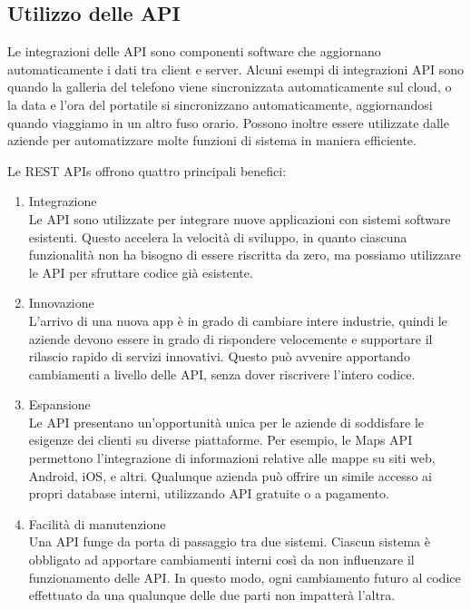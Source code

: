 \subsection{Utilizzo delle API}
Le integrazioni delle API sono componenti software che aggiornano automaticamente i dati tra client e server. Alcuni esempi di integrazioni API sono quando la galleria del telefono viene sincronizzata automaticamente sul cloud, o la data e l'ora del portatile si sincronizzano automaticamente, aggiornandosi quando viaggiamo in un altro fuso orario. Possono inoltre essere utilizzate dalle aziende per automatizzare molte funzioni di sistema in maniera efficiente.

Le REST APIs offrono quattro principali benefici:
\begin{enumerate}
    \item Integrazione\\
    Le API sono utilizzate per integrare nuove applicazioni con sistemi software esistenti. Questo accelera la velocità di sviluppo, in quanto ciascuna funzionalità non ha bisogno di essere riscritta da zero, ma possiamo utilizzare le API per sfruttare codice già esistente.
    \item Innovazione\\
    L'arrivo di una nuova app è in grado di cambiare intere industrie, quindi le aziende devono essere in grado di rispondere velocemente e supportare il rilascio rapido di servizi innovativi. Questo può avvenire apportando cambiamenti a livello delle API, senza dover riscrivere l'intero codice.
    \item Espansione\\
    Le API presentano un'opportunità unica per le aziende di soddisfare le esigenze dei clienti su diverse piattaforme. Per esempio, le Maps API permettono l'integrazione di informazioni relative alle mappe su siti web, Android, iOS, e altri. Qualunque azienda può offrire un simile accesso ai propri database interni, utilizzando API gratuite o a pagamento.
    \item Facilità di manutenzione\\
    Una API funge da porta di passaggio tra due sistemi. Ciascun sistema è obbligato ad apportare cambiamenti interni così da non influenzare il funzionamento delle API. In questo modo, ogni cambiamento futuro al codice effettuato da una qualunque delle due parti non impatterà l'altra.
\end{enumerate}

